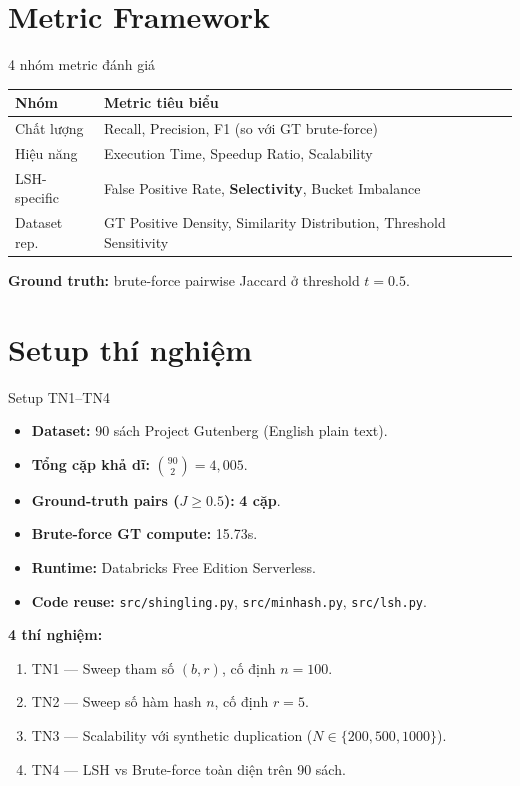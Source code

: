 \documentclass[10pt,aspectratio=169]{beamer}
\begin{document}
\section{Metric Framework}

\begin{frame}{4 nhóm metric đánh giá}
  \footnotesize
  \begin{tabular}{@{}lp{8cm}@{}}
    \toprule
    \textbf{Nhóm} & \textbf{Metric tiêu biểu} \\
    \midrule
    Chất lượng     & Recall, Precision, F1 (so với GT brute-force) \\
    Hiệu năng      & Execution Time, Speedup Ratio, Scalability \\
    LSH-specific   & False Positive Rate, \textbf{Selectivity}, Bucket Imbalance \\
    Dataset rep.   & GT Positive Density, Similarity Distribution, Threshold Sensitivity \\
    \bottomrule
  \end{tabular}

  \vfill
  \textbf{Ground truth:} brute-force pairwise Jaccard ở threshold $t = 0.5$.
\end{frame}

\section{Setup thí nghiệm}

\begin{frame}{Setup TN1--TN4}
  \begin{itemize}
    \item \textbf{Dataset:} 90 sách Project Gutenberg (English plain text).
    \item \textbf{Tổng cặp khả dĩ:} $\binom{90}{2} = 4{,}005$.
    \item \textbf{Ground-truth pairs ($J \geq 0.5$):} \textbf{4 cặp}.
    \item \textbf{Brute-force GT compute:} 15.73s.
    \item \textbf{Runtime:} Databricks Free Edition Serverless.
    \item \textbf{Code reuse:} \texttt{src/shingling.py}, \texttt{src/minhash.py}, \texttt{src/lsh.py}.
  \end{itemize}

  \vfill
  \textbf{4 thí nghiệm:}
  \begin{enumerate}
    \item TN1 --- Sweep tham số $(b, r)$, cố định $n = 100$.
    \item TN2 --- Sweep số hàm hash $n$, cố định $r = 5$.
    \item TN3 --- Scalability với synthetic duplication ($N \in \{200, 500, 1000\}$).
    \item TN4 --- LSH vs Brute-force toàn diện trên 90 sách.
  \end{enumerate}
\end{frame}
\end{document}
